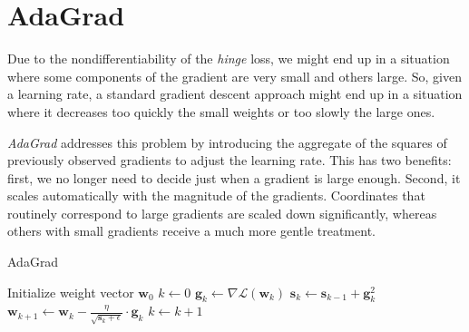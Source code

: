 \section{AdaGrad}

Due to the nondifferentiability of the \emph{hinge} loss, we might end up in a situation where some components of the gradient are very small and others large. So, given a learning rate, a standard gradient descent approach might end up in a situation where it decreases too quickly the small weights or too slowly the large ones.

\emph{AdaGrad} \cite{duchi2011adaptive} addresses this problem by introducing the aggregate of the squares of previously observed gradients to adjust the learning rate. This has two benefits: first, we no longer need to decide just when a gradient is large enough. Second, it scales automatically with the magnitude of the gradients. Coordinates that routinely correspond to large gradients are scaled down significantly, whereas others with small gradients receive a much more gentle treatment.

\begin{algorithm}[h!]
	\caption{AdaGrad}
	\label{alg:adagrad}
	\begin{algorithmic}[1]
			\State Initialize weight vector $\textbf{w}_0$
			\State $k \gets 0$
				\State $\textbf{g}_k \gets \nabla \mathcal{L}(\textbf{w}_k)$
				\State $\textbf{s}_k \gets \textbf{s}_{k-1} + \textbf{g}_k^2$
				\State $\textbf{w}_{k+1} \gets \textbf{w}_k - \displaystyle \frac{\eta}{\sqrt{\textbf{s}_k + \epsilon}} \cdot \textbf{g}_k$
				\State $k \gets k + 1$
			\EndWhile
		\EndProcedure
	\end{algorithmic}
\end{algorithm}
